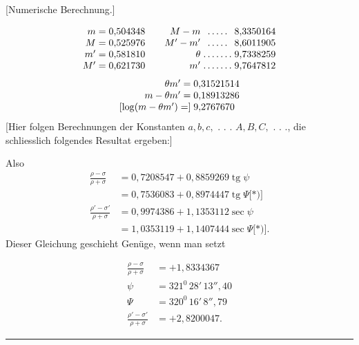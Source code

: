 \begin{center}[Numerische Berechnung.]\end{center}
\[
\begin{array}{r@{\qquad}r@{\;}c@{\;}l}
m=0{,}504348&M-m&.\,.\,.\,.\,.&8{,}3350164\\
M=0{,}525976&M'-m'&.\,.\,.\,.\,.&8{,}6011905\\
m'=0{,}581810&\theta&.\,.\,.\,.\,.\,.\,.&9{,}7338259\\
M'=0{,}621730&m'&.\,.\,.\,.\,.\,.\,.&9{,}7647812
\end{array}
\]
\[
\begin{array}{r@{\;}l}
\theta m'=&0{,}31521514\\
m-\theta m'=&0{,}18913286\\
{}[\log(m-\theta m')=]&9{,}2767670
\end{array}
\]
\noindent\hspace*{\parindent}[Hier folgen Berechnungen der Konstanten $a,b,c,$ . . . $A,B,C,$ . . ., die schliesslich folgendes Resultat ergeben:]

Also
\[
\begin{aligned}
\frac{\rho-\sigma}{\rho+\sigma}&=0{,}7208547+0{,}8859269\operatorname{tg}\psi\\
&=0{,}7536083+0{,}8974447\operatorname{tg}\Psi\text{[*)]}\\[5pt]
\frac{\rho'-\sigma'}{\rho+\sigma}&=0{,}9974386+1{,}1353112\sec\psi\\
&=1{,}0353119+1{,}1407444\sec\Psi\text{[*)]}.
\end{aligned}
\]
\begingroup\renewcommand{\thefootnote}{}\endgroup
\noindent Dieser Gleichung geschieht Genüge, wenn man setzt
\par{}
\clearpage{}
\[
\begin{aligned}
\frac{\rho-\sigma}{\rho+\sigma}&=+1{,}8334367\\[4pt]
\psi&=321^{0}\,28'\,13''{,}40\\
\Psi&=320^{0}\,16'\,8''{,}79\\[4pt]
\frac{\rho'-\sigma'}{\rho+\sigma}&=+2{,}8200047.
\end{aligned}
\]
\begin{center}\rule{.25\linewidth}{.4pt}\end{center}
\clearpage\endgroup
